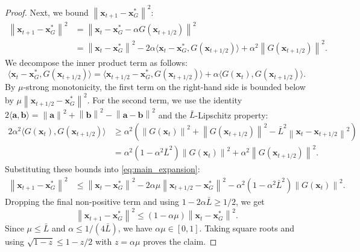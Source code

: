 \documentclass[letterpaper,11pt]{article}
\newcommand{\parenth}[1]{\left( #1 \right)}
\newcommand{\norm}[1]{\left\| #1 \right\|}
\newcommand{\vect}[1]{\mathbf{#1}}
\begin{document}
\begin{proof}
Next, we bound $\norm{\vect{x}_{t+1} - \vect{x}_G^*}^2$:
\begin{align}
\norm{\vect{x}_{t+1} - \vect{x}_G^*}^2
&= \norm{\vect{x}_t - \vect{x}_G^* - \alpha G(\vect{x}_{t+1/2})}^2 \nonumber \\
&= \norm{\vect{x}_t - \vect{x}_G^*}^2
 - 2\alpha \langle \vect{x}_t - \vect{x}_G^*, G(\vect{x}_{t+1/2}) \rangle
 + \alpha^2 \norm{G(\vect{x}_{t+1/2})}^2. \label{eq:main_expansion}
\end{align}
We decompose the inner product term as follows:
\[
\langle \vect{x}_t - \vect{x}_G^*, G(\vect{x}_{t+1/2}) \rangle
= \langle \vect{x}_{t+1/2} - \vect{x}_G^*, G(\vect{x}_{t+1/2}) \rangle
 + \alpha \langle G(\vect{x}_t), G(\vect{x}_{t+1/2}) \rangle.
\]
By \(\mu\)-strong monotonicity, the first term on the right-hand side is bounded below by \(\mu \norm{\vect{x}_{t+1/2} - \vect{x}_G^*}^2\). For the second term, we use the identity \(2\langle \vect{a}, \vect{b} \rangle = \norm{\vect{a}}^2 + \norm{\vect{b}}^2 - \norm{\vect{a}-\vect{b}}^2\) and the \(\bar L\)-Lipschitz property:
\begin{align*}
2\alpha^2 \langle G(\vect{x}_t), G(\vect{x}_{t+1/2}) \rangle
&\geq \alpha^2 \parenth{\norm{G(\vect{x}_t)}^2 + \norm{G(\vect{x}_{t+1/2})}^2 - \bar L^2 \norm{\vect{x}_t - \vect{x}_{t+1/2}}^2} \\
&= \alpha^2(1 - \alpha^2 \bar L^2)\norm{G(\vect{x}_t)}^2 + \alpha^2\norm{G(\vect{x}_{t+1/2})}^2.
\end{align*}
Substituting these bounds into \eqref{eq:main_expansion}:
\begin{align*}
\norm{\vect{x}_{t+1} - \vect{x}_G^*}^2
&\leq \norm{\vect{x}_t - \vect{x}_G^*}^2
 - 2\alpha\mu \norm{\vect{x}_{t+1/2} - \vect{x}_G^*}^2
 - \alpha^2(1 - \alpha^2\bar L^2)\norm{G(\vect{x}_t)}^2.
\end{align*}
Dropping the final non-positive term and using \(1-2\alpha\bar L\ge1/2\), we get
\[
\norm{\vect{x}_{t+1} - \vect{x}_G^*}^2
\le
\parenth{1-\alpha\mu}\norm{\vect{x}_t - \vect{x}_G^*}^2.
\]
Since \(\mu\le\bar L\) and \(\alpha\le1/(4\bar L)\), we have \(\alpha\mu\in[0,1]\). Taking square roots and using \(\sqrt{1-z}\le1-z/2\) with \(z=\alpha\mu\) proves the claim.
\end{proof}
\end{document}
